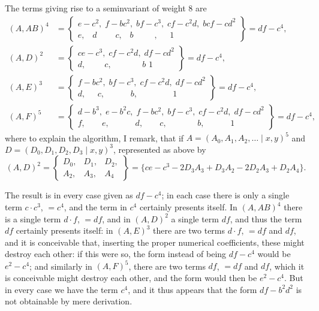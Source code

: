 \documentclass[11pt]{article}
\begin{document}
The terms giving rise to a seminvariant of weight 8 are
\begin{align*}
(A, AB)^4 &= \left\{\begin{array}{l} e - c^2,\;f - bc^2,\;bf - c^3,\;cf - c^2d,\;bcf - cd^2\\ e,\;\;\;d\;\;\;\;\;\;\;\;c,\;\;\;b\;\;\;\;\;\;\;\;\;,\;\;\;\;\;1 \end{array}\right\} = df - c^4,\\[4pt]
(A, D)^2 &= \left\{\begin{array}{l} ce - c^3,\;cf - c^2d,\;df - cd^2\\ d,\;\;\;\;\;\;\;\;c,\;\;\;\;\;\;\;\;\;\;\;\;\;b\,\,1 \end{array}\right\} = df - c^4,\\[4pt]
(A, E)^3 &= \left\{\begin{array}{l} f - bc^2,\;bf - c^3,\;cf - c^2d,\;df - cd^2\\ d,\;\;\;\;\;c,\;\;\;\;\;\;\;\;\;\;\;b,\;\;\;\;\;\;\;\;\;\;\;\;\;\;\;1 \end{array}\right\} = df - c^4,\\[4pt]
(A, F)^5 &= \left\{\begin{array}{l} d - b^3,\;e - b^2c,\;f - bc^2,\;bf - c^3,\;cf - c^2d,\;df - cd^2\\ f,\;\;\;\;\;\;\;e,\;\;\;\;\;\;\;\;\;\;\;d,\;\;\;\;\;\;\;c,\;\;\;\;\;\;\;\;\;\;\;\;\;b,\;\;\;\;\;\;\;\;\;\;\;1 \end{array}\right\} = df - c^4,
\end{align*}
where to explain the algorithm, I remark, that if $A = (A_0, A_1, A_2, \ldots \mid x, y)^5$ and $D = (D_0, D_1, D_2, D_3 \mid x, y)^3$, represented as above by
\[ (A, D)^2 = \begin{Bmatrix} D_0, & D_1, & D_2,\\ A_2, & A_3, & A_4 \end{Bmatrix} = \{ce - c^3 - 2D_3A_3 + D_3A_2 - 2D_2A_3 + D_2A_4\}. \]

The result is in every case given as $df - c^4$; in each case there is only a single term $c\cdot c^3$, $= c^4$, and the term in $c^4$ certainly presents itself. In $(A, AB)^4$ there is a single term $d\cdot f$, $= df$, and in $(A, D)^2$ a single term $df$, and thus the term $df$ certainly presents itself: in $(A, E)^3$ there are two terms $d\cdot f$, $= df$ and $df$, and it is conceivable that, inserting the proper numerical coefficients, these might destroy each other: if this were so, the form instead of being $df - c^4$ would be $e^2 - c^4$; and similarly in $(A, F)^5$, there are two terms $df$, $= df$ and $df$, which it is conceivable might destroy each other, and the form would then be $e^2 - c^4$. But in every case we have the term $c^4$, and it thus appears that the form $df - b^2d^2$ is not obtainable by mere derivation.
\end{document}
